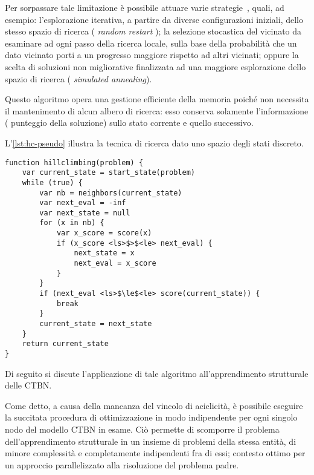 Per sorpassare tale limitazione è possibile attuare varie strategie~\citep[si veda][]{Russel2003}, quali, ad esempio: l'esplorazione iterativa, a partire da diverse configurazioni iniziali, dello stesso spazio di ricerca (\ie{} \emph{random restart} \emph{\keyword{\hc{}}}); la selezione stocastica del vicinato da esaminare ad ogni passo della ricerca locale, sulla base della probabilità che un dato vicinato porti a un progresso maggiore rispetto ad altri vicinati; oppure la scelta di soluzioni non migliorative finalizzata ad una maggiore esplorazione dello spazio di ricerca (\ie{} \emph{simulated annealing}).

\begin{notas}
Questo algoritmo opera una gestione efficiente della memoria poiché non necessita il mantenimento di alcun albero di ricerca: esso conserva solamente l'informazione (\ie{} punteggio della soluzione) sullo stato corrente e quello successivo.
\end{notas}

L'\autoref{lst:hc-pseudo} illustra la tecnica di ricerca \emph{\keyword{\hc{}}} dato uno spazio degli stati discreto.
\vspace*{8pt}\begin{lstlisting}[language=pseudo, label=lst:hc-pseudo, caption={[Algoritmo \hc{}]Algoritmo \emph{\keyword{\hc{}}} per uno spazio degli stati discreto.}]
function hillclimbing(problem) {
    var current_state = start_state(problem)
    while (true) {
        var nb = neighbors(current_state)
        var next_eval = -inf
        var next_state = null
        for (x in nb) {
            var x_score = score(x)
            if (x_score <ls>$>$<le> next_eval) {
                next_state = x
                next_eval = x_score
            }
        }
        if (next_eval <ls>$\le$<le> score(current_state)) {
            break
        }
        current_state = next_state
    }
    return current_state
}
\end{lstlisting}

Di seguito si discute l'applicazione di tale algoritmo all'apprendimento strutturale delle \acs{CTBN}.

Come detto, a causa della mancanza del vincolo di aciclicità, è possibile eseguire la succitata procedura di ottimizzazione in modo indipendente per ogni singolo nodo del modello \acs{CTBN} in esame. Ciò permette di scomporre il problema dell'apprendimento strutturale in un insieme di problemi della stessa entità, di minore complessità e completamente indipendenti fra di essi; contesto ottimo per un approccio parallelizzato alla risoluzione del problema padre.

